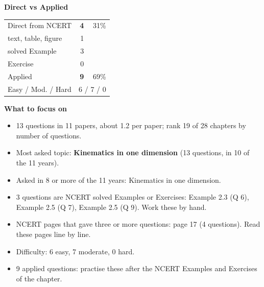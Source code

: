 \begin{minipage}[t]{0.34\linewidth}{\small\textbf{\color{crimson}Direct vs Applied}\par\smallskip
\begin{tabular}{@{}lrr@{}}\toprule
Direct from NCERT & \textbf{4} & 31\%\\
\quad text, table, figure & 1 &\\
\quad solved Example & 3 &\\
\quad Exercise & 0 &\\
Applied & \textbf{9} & 69\%\\\midrule
Easy / Mod. / Hard & \multicolumn{2}{r}{6 / 7 / 0}\\\bottomrule
\end{tabular}}\end{minipage}\hfill
\begin{minipage}[t]{0.63\linewidth}{\small\textbf{\color{crimson}What to focus on}\par\smallskip
\begin{itemize}[leftmargin=1.1em,itemsep=1pt,topsep=0pt]
\item 13 questions in 11 papers, about 1.2 per paper; rank 19 of 28 chapters by number of questions.
\item Most asked topic: \textbf{Kinematics in one dimension} (13 questions, in 10 of the 11 years).
\item Asked in 8 or more of the 11 years: Kinematics in one dimension.
\item 3 questions are NCERT solved Examples or Exercises: Example 2.3 (Q 6), Example 2.5 (Q 7), Example 2.5 (Q 9). Work these by hand.
\item NCERT pages that gave three or more questions: page 17 (4 questions). Read these pages line by line.
\item Difficulty: 6 easy, 7 moderate, 0 hard.
\item 9 applied questions: practise these after the NCERT Examples and Exercises of the chapter.
\end{itemize}}\end{minipage}\par
{}
